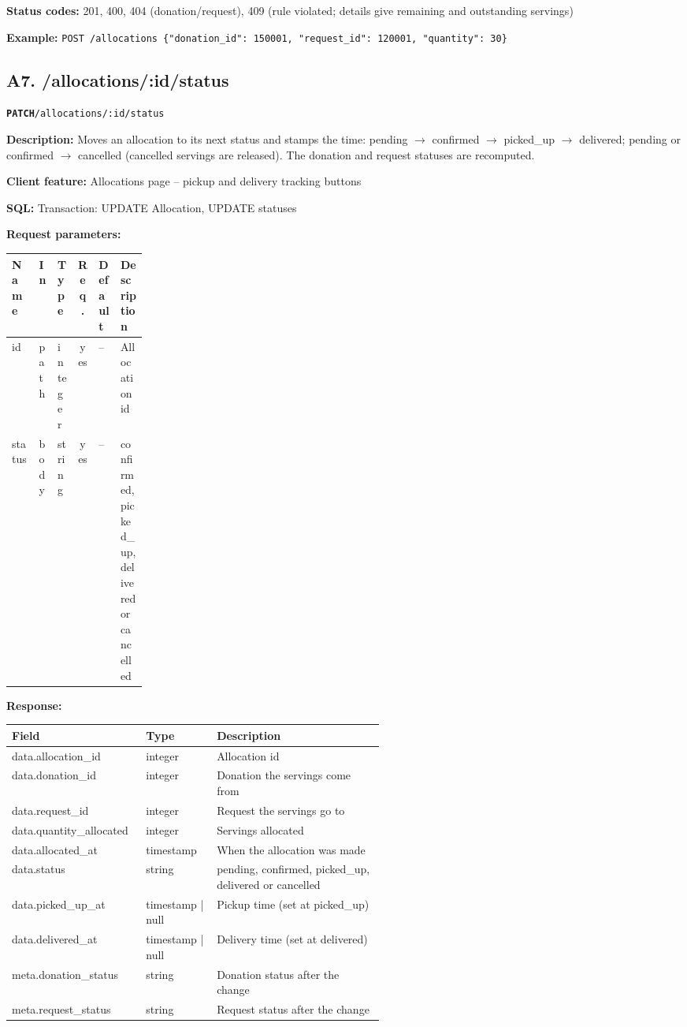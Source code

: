 \documentclass[11pt,letterpaper]{article}
\newcommand{\brk}{\penalty0\relax}
\newcommand{\routebar}[2]{%
  \par\noindent\colorbox{boxGray}{\parbox{\dimexpr\linewidth-2\fboxsep}{%
  \strut\textbf{\texttt{#1}}\quad\texttt{#2}\strut}}\par\smallskip}
\newcommand{\kv}[2]{\textbf{#1:} #2\par}
\begin{document}
\kv{Status codes}{201, 400, 404 (donation/request), 409 (rule violated; details give remaining and outstanding servings)}
{\raggedright\textbf{Example:} {\small \texttt{POST /\brk{}allocations  \{"donation\_id": 150001,\brk{} "request\_id": 120001,\brk{} "quantity": 30\}}}\par}
\subsection*{A7. /allocations/:id/status}
\routebar{PATCH}{/allocations/:id/status}
\kv{Description}{Moves an allocation to its next status and stamps the time: pending $\rightarrow$ confirmed $\rightarrow$ picked\_up $\rightarrow$ delivered; pending or confirmed $\rightarrow$ cancelled (cancelled servings are released). The donation and request statuses are recomputed.}
\kv{Client feature}{Allocations page -- pickup and delivery tracking buttons}
\kv{SQL}{Transaction: UPDATE Allocation, UPDATE statuses}
\kv{Request parameters}{}
\begin{xltabular}{\linewidth}{>{\ttfamily\raggedright\arraybackslash}p{0.2\linewidth} l l c l >{\raggedright\arraybackslash}X}
\toprule
\textrm{\textbf{Name}} & \textbf{In} & \textbf{Type} & \textbf{Req.} & \textbf{Default} & \textbf{Description} \\
\midrule
id & path & integer & yes & -- & Allocation id \\
status & body & string & yes & -- & confirmed, picked\_up, delivered or cancelled \\
\bottomrule
\end{xltabular}
\kv{Response}{}
\begin{xltabular}{\linewidth}{>{\ttfamily\raggedright\arraybackslash}p{0.36\linewidth} >{\raggedright\arraybackslash}p{0.19\linewidth} >{\raggedright\arraybackslash}X}
\toprule
\textrm{\textbf{Field}} & \textbf{Type} & \textbf{Description} \\
\midrule
data.\brk{}allocation\_id & integer & Allocation id \\
data.\brk{}donation\_id & integer & Donation the servings come from \\
data.\brk{}request\_id & integer & Request the servings go to \\
data.\brk{}quantity\_allocated & integer & Servings allocated \\
data.\brk{}allocated\_at & timestamp & When the allocation was made \\
data.\brk{}status & string & pending, confirmed, picked\_up, delivered or cancelled \\
data.\brk{}picked\_up\_at & timestamp | null & Pickup time (set at picked\_up) \\
data.\brk{}delivered\_at & timestamp | null & Delivery time (set at delivered) \\
meta.\brk{}donation\_status & string & Donation status after the change \\
meta.\brk{}request\_status & string & Request status after the change \\
\bottomrule
\end{xltabular}
\end{document}
